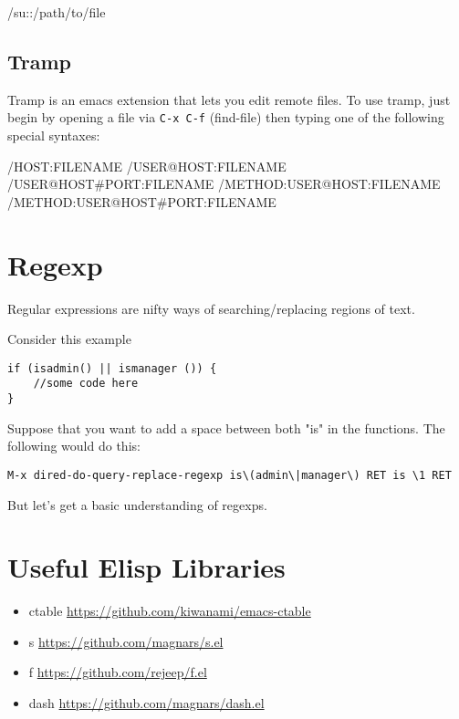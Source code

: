 \documentclass[11pt]{article}
\begin{document}
/su::/path/to/file
\subsection{Tramp}
\label{sec:orgheadline36}
Tramp is an emacs extension that lets you edit remote files. To use tramp, just begin by opening a file via \texttt{C-x C-f} (find-file) then typing one of the following special syntaxes:

/HOST:FILENAME
/USER@HOST:FILENAME
/USER@HOST\#PORT:FILENAME
/METHOD:USER@HOST:FILENAME
/METHOD:USER@HOST\#PORT:FILENAME
\section{Regexp}
\label{sec:orgheadline38}
Regular expressions are nifty ways of searching/replacing regions of text.

Consider this example

\begin{verbatim}
if (isadmin() || ismanager ()) {
    //some code here
}
\end{verbatim}

Suppose that you want to add a space between both "is" in the functions.  The following would do this:

\texttt{M-x dired-do-query-replace-regexp is\textbackslash{}(admin\textbackslash{}|manager\textbackslash{}) RET is \textbackslash{}1 RET}

But let's get a basic understanding of regexps.

\section{Useful Elisp Libraries}
\label{sec:orgheadline39}
\begin{itemize}
\item ctable \url{https://github.com/kiwanami/emacs-ctable}
\item s \url{https://github.com/magnars/s.el}
\item f \url{https://github.com/rejeep/f.el}
\item dash \url{https://github.com/magnars/dash.el}
\end{itemize}
\end{document}
